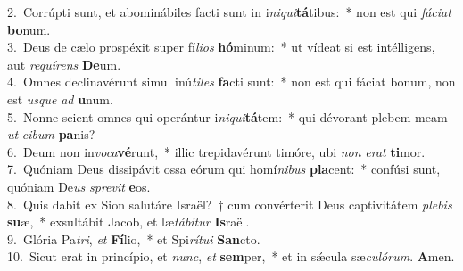 {2.~}Corrúpti sunt, et abominábiles facti sunt in i\textit{ni}\textit{qui}\textbf{tá}tibus:~* non est qui \textit{fá}\textit{ci}\textit{at} \textbf{bo}num.\\
{3.~}Deus de cælo prospéxit super fí\textit{li}\textit{os} \textbf{hó}minum:~* ut vídeat si est intélligens, aut \textit{re}\textit{quí}\textit{rens} \textbf{De}um.\\
{4.~}Omnes declinavérunt simul inú\textit{ti}\textit{les} \textbf{fa}cti sunt:~* non est qui fáciat bonum, non est \textit{us}\textit{que} \textit{ad} \textbf{u}num.\\
{5.~}Nonne scient omnes qui operántur i\textit{ni}\textit{qui}\textbf{tá}tem:~* qui dévorant plebem meam \textit{ut} \textit{ci}\textit{bum} \textbf{pa}nis?\\
{6.~}Deum non in\textit{vo}\textit{ca}\textbf{vé}runt,~* illic trepidavérunt timóre, ubi \textit{non} \textit{e}\textit{rat} \textbf{ti}mor.\\
{7.~}Quóniam Deus dissipávit ossa eórum qui homí\textit{ni}\textit{bus} \textbf{pla}cent:~* confúsi sunt, quóniam De\textit{us} \textit{spre}\textit{vit} \textbf{e}os.\\
{8.~}Quis dabit ex Sion salutáre Israël?~† cum convérterit Deus captivitátem \textit{ple}\textit{bis} \textbf{su}æ,~* exsultábit Jacob, et læ\textit{tá}\textit{bi}\textit{tur} \textbf{Is}raël.\\
{9.~}Glória Pa\textit{tri}, \textit{et} \textbf{Fí}lio,~* et Spi\textit{rí}\textit{tu}\textit{i} \textbf{San}cto.\\
{10.~}Sicut erat in princípio, et \textit{nunc}, \textit{et} \textbf{sem}per,~* et in sǽcula sæ\textit{cu}\textit{ló}\textit{rum}. \textbf{A}men.\\
